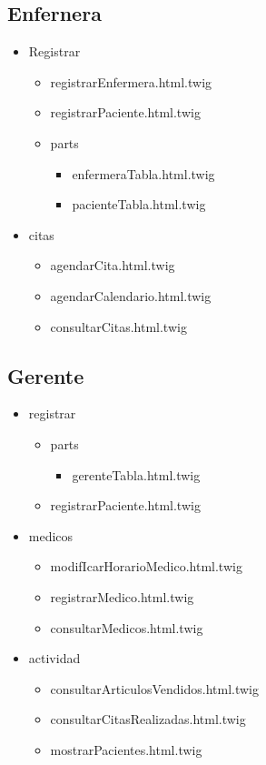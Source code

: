 		\subsection{Enfernera}
		\begin{itemize}
		\item Registrar
		\begin{itemize}
		\item registrarEnfermera.html.twig
		\item registrarPaciente.html.twig
		\item parts
			\begin{itemize}
				\item enfermeraTabla.html.twig
				\item pacienteTabla.html.twig
			\end{itemize}
		\end{itemize}
		\item citas 
			\begin{itemize}
				\item agendarCita.html.twig
				\item agendarCalendario.html.twig
				\item consultarCitas.html.twig
			\end{itemize}
		\end{itemize}
		
		\subsection{Gerente}
		\begin{itemize}
			\item registrar
			\begin{itemize}
				\item parts 
				\begin{itemize}
				\item gerenteTabla.html.twig
				\end{itemize}
				\item registrarPaciente.html.twig
			\end{itemize}
			\item medicos 
			\begin{itemize}
			\item modifIcarHorarioMedico.html.twig
			\item registrarMedico.html.twig
			\item consultarMedicos.html.twig
			\end{itemize}
			\item actividad
			\begin{itemize}
				\item consultarArticulosVendidos.html.twig
				\item consultarCitasRealizadas.html.twig
				\item mostrarPacientes.html.twig
			\end{itemize}
		\end{itemize}
		
